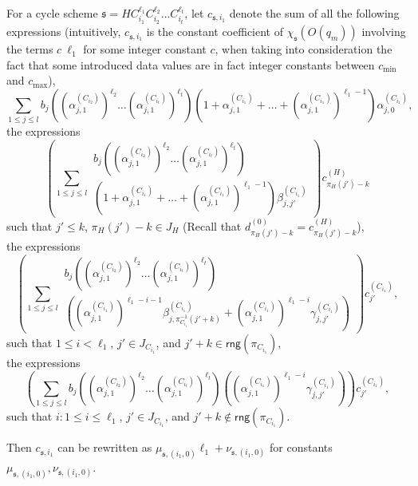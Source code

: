 \documentclass[runningheads,a4paper]{llncs}
\def\schm{{\mathfrak{s} }}
\newcommand\rng{\mathsf{rng}}
\begin{document}
For a cycle scheme $\schm=HC_{i_1}^{\ell_1} C_{i_2}^{\ell_2} \dots C_{i_t}^{\ell_t}$, let $c_{\schm,i_1}$ denote the sum of all the following expressions (intuitively, $c_{\schm,i_1}$ is the constant coefficient of $\chi_\schm(O(q_m))$ involving the terms $ c\ \ell_1$ for some integer constant $c$, when taking into consideration the fact that some introduced data values are in fact integer constants between $c_{\min}$ and $c_{\max}$),
\[
\sum \limits_{1 \le j \le l} 
b_j \left((\alpha^{(C_{i_2})}_{j,1})^{\ell_2} \dots (\alpha^{(C_{i_t})}_{j,1})^{\ell_t}\right) 
\left(1+\alpha^{(C_{i_1})}_{j,1} + \dots + (\alpha^{(C_{i_1})}_{j,1})^{\ell_1-1} \right) \alpha^{(C_{i_1})}_{j,0},
\]
the expressions 
\[
\left(\sum \limits_{1 \le j \le l} 
\begin{array}{l}
b_j \left((\alpha^{(C_{i_2})}_{j,1})^{\ell_2} \dots (\alpha^{(C_{i_t})}_{j,1})^{\ell_t}\right) \\
\left(1+\alpha^{(C_{i_1})}_{j,1} + \dots + (\alpha^{(C_{i_1})}_{j,1})^{\ell_1-1} \right) \beta^{(C_{i_1})}_{j,j'}
\end{array}
\right) c^{(H)}_{\pi_H(j')-k}
\]
such that $j' \le k$, $\pi_H(j')-k \in J_H$ (Recall that $d^{(0)}_{\pi_H(j')-k}=c^{(H)}_{\pi_H(j')-k}$), \\
the expressions
\[
\left(\sum \limits_{1 \le j \le l} 
\begin{array}{l}
b_j \left((\alpha^{(C_{i_2})}_{j,1})^{\ell_2} \dots (\alpha^{(C_{i_t})}_{j,1})^{\ell_t}\right) \\
\left((\alpha^{(C_{i_1})}_{j,1})^{\ell_1-i-1} \beta^{(C_{i_1})}_{j,\pi^{-1}_{C_{i_1}}(j'+k)} + (\alpha^{(C_{i_1})}_{j,1})^{\ell_1-i} \gamma^{(C_{i_1})}_{j,j'}\right)
\end{array}
\right) c^{(C_{i_1})}_{j'},
\]
such that $1 \le i < \ell_1$, $j' \in J_{C_{i_1}}$, and $j'+k \in \rng(\pi_{C_{i_1}})$,\\
the expressions
\[
\left(\sum \limits_{1 \le j \le l} 
b_j \left((\alpha^{(C_{i_2})}_{j,1})^{\ell_2} \dots (\alpha^{(C_{i_t})}_{j,1})^{\ell_t}\right)  \left( (\alpha^{(C_{i_1})}_{j,1})^{\ell_1-i} \gamma^{(C_{i_1})}_{j,j'}\right)
\right) c^{(C_{i_1})}_{j'},
\]
such that $i: 1 \le i \le \ell_1$, $j' \in J_{C_{i_1}}$, and $j'+k \not \in \rng(\pi_{C_{i_1}})$.

Then $c_{\schm,i_1}$ can be rewritten as $\mu_{\schm, (i_1,0)} \ell_1 + \nu_{\schm, (i_1,0)}$ for constants $\mu_{\schm, (i_1,0)},\nu_{\schm, (i_1,0)}$.
\end{document}
